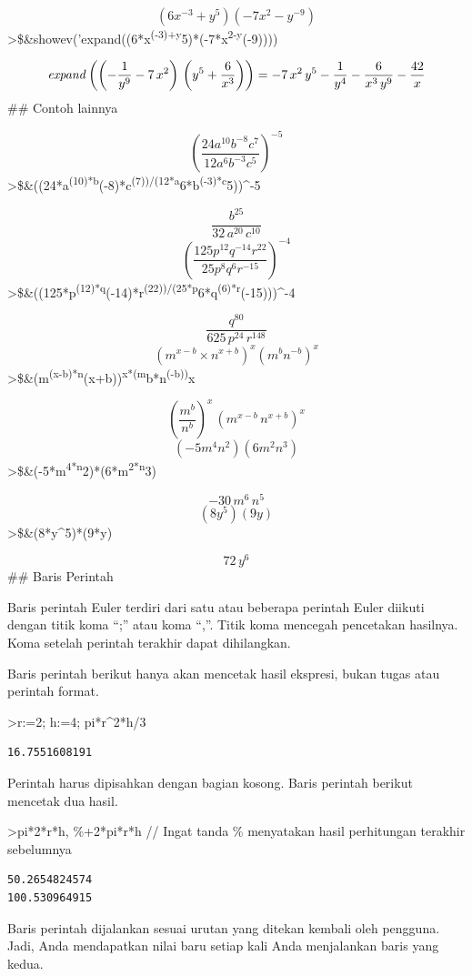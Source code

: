\documentclass[
]{book}
\begin{document}
\[(6x^{-3}+y^5)(-7x^2-y^{-9})\]\textgreater\$\&showev('expand((6*x\textsuperscript{(-3)+y}5)*(-7*x\textsuperscript{2-y}(-9))))

\[{\it expand}\left(\left(-\frac{1}{y^9}-7\,x^2\right)\,\left(y^5+  \frac{6}{x^3}\right)\right)=-7\,x^2\,y^5-\frac{1}{y^4}-\frac{6}{x^3  \,y^9}-\frac{42}{x}\]\#\# Contoh lainnya

\[(\frac {24a^{10}b^{-8}c^7}{12a^6b^{-3}c^5})^{-5}\]\textgreater\$\&((24*a\textsuperscript{(10)*b}(-8)*c\textsuperscript{(7))/(12*a}6*b\textsuperscript{(-3)*c}5))\^{}-5

\[\frac{b^{25}}{32\,a^{20}\,c^{10}}\]\[(\frac{125p^{12}q^{-14}r^{22}}{25p^8q^6r^{-15}})^{-4}\]\textgreater\$\&((125*p\textsuperscript{(12)*q}(-14)*r\textsuperscript{(22))/(25*p}6*q\textsuperscript{(6)*r}(-15)))\^{}-4

\[\frac{q^{80}}{625\,p^{24}\,r^{148}}\]\[(m^{x-b}\times n^{x+b})^x(m^bn^{-b})^x\]\textgreater\$\&(m\textsuperscript{(x-b)*n}(x+b))\textsuperscript{x*(m}b*n\textsuperscript{(-b))}x

\[\left(\frac{m^{b}}{n^{b}}\right)^{x}\,\left(m^{x-b}\,n^{x+b}\right)  ^{x}\]\[(-5m^4n^2)(6m^2n^3)\]\textgreater\$\&(-5*m\textsuperscript{4*n}2)*(6*m\textsuperscript{2*n}3)

\[-30\,m^6\,n^5\]\[(8y^5)(9y)\]\textgreater\$\&(8*y\^{}5)*(9*y)

\[72\,y^6\]\#\# Baris Perintah

Baris perintah Euler terdiri dari satu atau beberapa perintah Euler diikuti dengan titik koma ``;'' atau koma ``,''. Titik koma mencegah pencetakan hasilnya. Koma setelah perintah terakhir dapat dihilangkan.

Baris perintah berikut hanya akan mencetak hasil ekspresi, bukan tugas atau perintah format.

\textgreater r:=2; h:=4; pi*r\^{}2*h/3

\begin{verbatim}
16.7551608191
\end{verbatim}

Perintah harus dipisahkan dengan bagian kosong. Baris perintah berikut mencetak dua hasil.

\textgreater pi*2*r*h, \%+2*pi*r*h // Ingat tanda \% menyatakan hasil perhitungan terakhir sebelumnya

\begin{verbatim}
50.2654824574
100.530964915
\end{verbatim}

Baris perintah dijalankan sesuai urutan yang ditekan kembali oleh pengguna. Jadi, Anda mendapatkan nilai baru setiap kali Anda menjalankan baris yang kedua.
\end{document}
